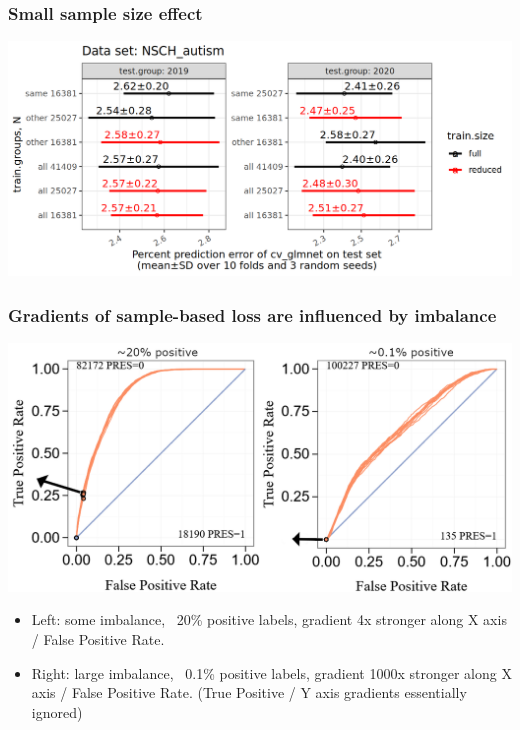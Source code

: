 \documentclass[t]{beamer}
\begin{document}
\begin{frame}
  \frametitle{Small sample size effect}
  \includegraphics[width=\textwidth]{NSCH_autism_error_glmnet_sizes_mean_sd_more}
\end{frame}



\begin{frame}
  \frametitle{Gradients of sample-based loss are influenced by imbalance}
  \includegraphics[width=\textwidth]{roc-gradient-arrows}
  \begin{itemize}
  \item Left: some imbalance, ~20\% positive labels, gradient 4x
    stronger along X axis / False Positive Rate.
  \item Right: large imbalance, ~0.1\% positive labels, gradient 1000x
    stronger along X axis / False Positive Rate. (True Positive / Y
    axis gradients essentially ignored)
  \end{itemize}
\end{frame}
\end{document}
